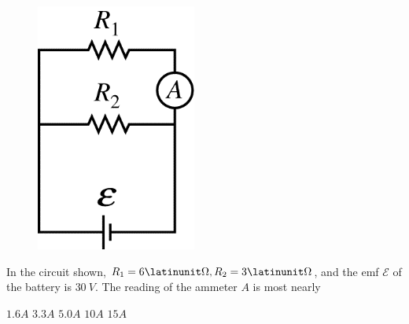 \begin{figure}[H]
\centering
\includegraphics[scale=0.3]{images/img-009-015.png}
\end{figure}

\begin{questions}\setcounter{question}{16}\question
In the circuit shown, $R_{1}=6 \latinunit\Omega, R_{2}=3 \latinunit\Omega$, and the emf $\mathcal{E}$ of the battery is $30 \unit{~V}$. The reading of the ammeter $A$ is most nearly

\begin{oneparchoices}
\choice $1.6 \unit{A}$
\choice $3.3 \unit{A}$
\choice $5.0 \unit{A}$
\choice $10 \unit{A}$
\choice $15 \unit{A}$
\end{oneparchoices}\end{questions}

